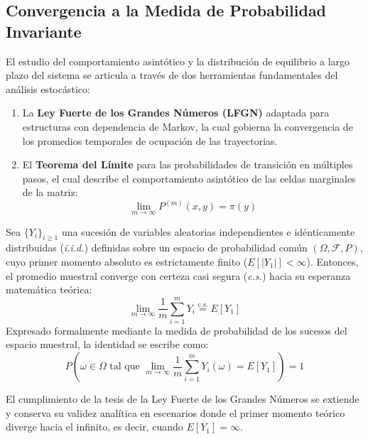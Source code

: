 \subsection{Convergencia a la Medida de Probabilidad Invariante}
\noindent
El estudio del comportamiento asintótico y la distribución de equilibrio a largo plazo del sistema se articula a través de dos herramientas fundamentales del análisis estocástico:
\begin{enumerate}
    \item[\textbf{1)}] La \textbf{Ley Fuerte de los Grandes Números (LFGN)} adaptada para estructuras con dependencia de Markov, la cual gobierna la convergencia de los promedios temporales de ocupación de las trayectorias.
    \item[\textbf{2)}] El \textbf{Teorema del Límite} para las probabilidades de transición en múltiples pasos, el cual describe el comportamiento asintótico de las celdas marginales de la matriz:
    \[
    \lim_{m \to \infty} P^{(m)}(x, y) = \pi(y)
    \]
\end{enumerate}


\begin{teo}
    Sea $\{Y_i\}_{i \geq 1}$ una sucesión de variables aleatorias independientes e idénticamente distribuidas (\textit{i.i.d.}) definidas sobre un espacio de probabilidad común $(\Omega, \mathcal{F}, P)$, cuyo primer momento absoluto es estrictamente finito ($E[|Y_1|] < \infty$). Entonces, el promedio muestral converge con certeza casi segura (\textit{c.s.}) hacia su esperanza matemática teórica:
    \[
    \lim_{m \to \infty} \frac{1}{m} \sum_{i=1}^{m} Y_i \overset{\text{c.s.}}{=} E[Y_1]
    \]
    Expresado formalmente mediante la medida de probabilidad de los sucesos del espacio muestral, la identidad se escribe como:
    \[
    P\left( \omega \in \Omega \text{ tal que } \lim_{m \to \infty} \frac{1}{m} \sum_{i=1}^{m} Y_i(\omega) = E[Y_1] \right) = 1
    \]
\end{teo}

\begin{observacion}
    El cumplimiento de la tesis de la Ley Fuerte de los Grandes Números se extiende y conserva su validez analítica en escenarios donde el primer momento teórico diverge hacia el infinito, es decir, cuando $E[Y_1] = \infty$.
\end{observacion}

